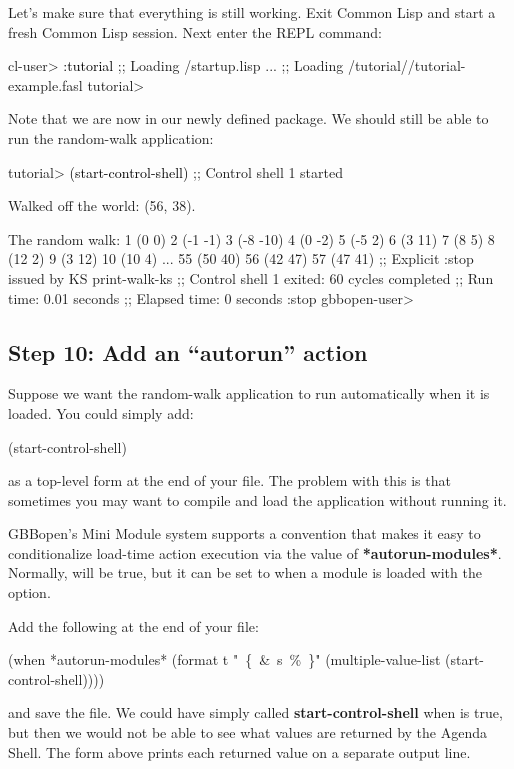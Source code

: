 \documentclass[10pt,twoside,english,pdftex]{article}
\begin{document}
Let's make sure that everything is still working.  Exit Common Lisp and start
a fresh Common Lisp session.  Next enter the
 REPL command:
%
\W\supp
\begin{example}
\textcolor{darkergray}{%
  cl-user> \textcolor{black}{:tutorial}
  ;; Loading /startup.lisp
     ...
  ;; Loading /tutorial//tutorial-example.fasl
  tutorial>}
\end{example}
%
Note that we are now in our newly defined  package.  We should
still be able to run the random-walk application:
%
\W\supp\notpretop
\begin{example}
\textcolor{darkergray}{%
  tutorial> \textcolor{black}{(start-control-shell)}
  ;; Control shell 1 started

  Walked off the world:  (56, 38).

  The random walk:
  1 (0 0)
  2 (-1 -1)
  3 (-8 -10)
  4 (0 -2)
  5 (-5 2)
  6 (3 11)
  7 (8 5)
  8 (12 2)
  9 (3 12)
  10 (10 4)
       ...
  55 (50 40)
  56 (42 47)
  57 (47 41)
  ;; Explicit :stop issued by KS print-walk-ks
  ;; Control shell 1 exited: 60 cycles completed
  ;; Run time: 0.01 seconds
  ;; Elapsed time: 0 seconds
  :stop
  gbbopen-user>}
\end{example}

\subsection*{Step 10: Add an ``autorun'' action}

Suppose we want the random-walk application to run automatically when it is
loaded.  You could simply add:
% 
\W\supp
\begin{example}
\textcolor{darkergray}{%
  (start-control-shell)}
\end{example}
%
as a top-level form at the end of your  file.  The
problem with this is that sometimes you may want to compile and load the
application without running it.  

GBBopen's Mini Module system supports a convention that makes it easy to
conditionalize load-time action execution via the value of
\textbf{*autorun-modules*}.  Normally,  will be
true, but it can be set to \nil{} when a module is loaded with the
 option.

Add the following at the end of your 
file:
% 
\W\supp
\begin{example}
  (when *autorun-modules* 
    (format t "~\{~\&~s~\%~\}" (multiple-value-list (start-control-shell))))
\end{example}
%
and save the file.  We could have simply called \textbf{start-control-shell}
when  is true, but then we would not be able to see
what values are returned by the Agenda Shell.  The  form above
prints each returned value on a separate output line.
\end{document}
